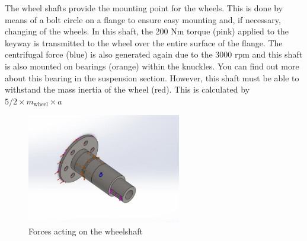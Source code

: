 The wheel shafts provide the mounting point for the wheels. This is done by means of a bolt circle on a flange to ensure easy mounting and, if necessary, changing of the wheels. In this shaft, the 200 Nm torque (pink) applied to the keyway is transmitted to the wheel over the entire surface of the flange. The centrifugal force (blue) is also generated again due to the 3000 rpm and this shaft is also mounted on bearings (orange) within the knuckles. You can find out more about this bearing in the suspension section. However, this shaft must be able to withstand the mass inertia of the wheel (red). This is calculated by
\(5/2 \times m_{\text{wheel}} \times a\)

\begin{figure}[ht]
\centering
\includegraphics[width=0.6\textwidth]{texfiles/mech/eimg/propulsion/picture_forces_wheelshaft}
\caption{Forces acting on the wheelshaft}
\label{fig:wheelshaft_forces}
\end{figure}

